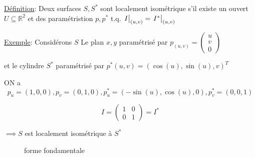 \underline{Définition}: Deux surfaces $S, S^*$ sont localement isométrique s'il existe un ouvert $U \subseteq \mathbb{R}^{2} $ et des paramétristion $p, p^*$ t.q. $\eval{I}_{(u,v)} = \eval{I^*}_{(u,v)}$    

\underline{Exemple}: Considérons $S$ Le plan $x,y $ paramétrisé par $p_{(u,v)} = \begin{pmatrix} u\\v\\0
	
\end{pmatrix}$    

et le cylindre $S^*$ paramétrisé par $p^*(u,v) = (\cos(u),\sin(u), v)^T$

ON a $$p_{u}= (1,0,0), p_{v}=(0,1,0), p_{u}^* =(-\sin(u), \cos(u),0), p_{v}^* = (0,0,1)$$ 

			$$I = \begin{pmatrix} 1 & 0 \\ 0 & 1
	
\end{pmatrix} = I^*$$

$\implies S$ est localement isométrique à $S^*$  

\begin{figure}[ht]
    \centering
    \caption{forme fondamentale}
    \label{fig:forme-fondamentale}
\end{figure}


